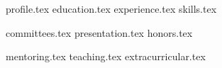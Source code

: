 \documentclass[11pt, a4paper]{awesome-cv}
\newcommand*{\sectiondir}{cv-sections/}
\begin{document}
\makecvheader %

{profile.tex}
{education.tex}
{experience.tex}
{skills.tex}

{committees.tex}
%
{presentation.tex}
{honors.tex}

{mentoring.tex}
{teaching.tex}
{extracurricular.tex}

\end{document}
